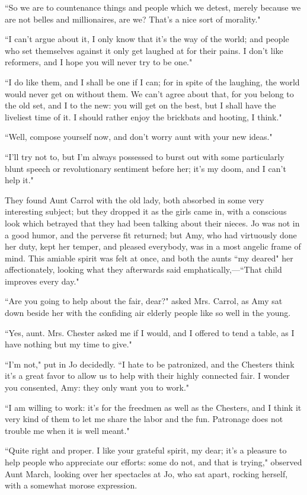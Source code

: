 ``So we are to countenance things and people which we detest, merely
because we are not belles and millionaires, are we?
That's a nice sort of morality."

``I can't argue about it, I only know that
it's the way of the world; and people who set themselves
against it only get laughed at for their pains. I don't
like reformers, and I hope you will never try to be one."

``I do like them, and I shall be one if I can; for in spite of the
laughing, the world would never get on without them. We
can't agree about that, for you belong to the old set,
and I to the new: you will get on the best, but I shall have the
liveliest time of it. I should rather enjoy the brickbats and hooting, I
think."

``Well, compose yourself now, and don't worry aunt with
your new ideas."

``I'll try not to, but I'm always
possessed to burst out with some particularly blunt speech or
revolutionary sentiment before her; it's my doom, and I
can't help it."

They found Aunt Carrol with the old lady, both absorbed in some very
interesting subject; but they dropped it as the girls came in, with a
conscious look which betrayed that they had been talking about their
nieces. Jo was not in a good humor, and the perverse fit returned; but
Amy, who had virtuously done her duty, kept her temper, and pleased
everybody, was in a most angelic frame of mind. This amiable spirit was
felt at once, and both the aunts ``my deared" her affectionately, looking
what they afterwards said emphatically,---``That child improves every
day."

``Are you going to help about the fair, dear?" asked Mrs. Carrol, as Amy
sat down beside her with the confiding air elderly people like so well
in the young.

``Yes, aunt. Mrs. Chester asked me if I would, and I offered to tend a
table, as I have nothing but my time to give."

``I'm not," put in Jo decidedly. ``I hate to be
patronized, and the Chesters think it's a great favor to
allow us to help with their highly connected fair. I wonder you
consented, Amy: they only want you to work."

``I am willing to work: it's for the freedmen as well as
the Chesters, and I think it very kind of them to let me share the labor
and the fun. Patronage does not trouble me when it is well meant."

``Quite right and proper. I like your grateful spirit, my dear;
it's a pleasure to help people who appreciate our
efforts: some do not, and that is trying," observed Aunt March, looking
over her spectacles at Jo, who sat apart, rocking herself, with a
somewhat morose expression.

